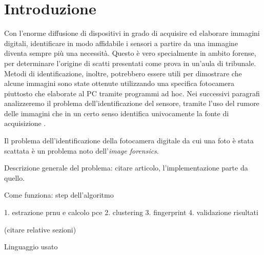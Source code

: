 \section{Introduzione}

Con l’enorme diffusione di dispositivi in grado di acquisire ed elaborare
immagini digitali, identificare in modo affidabile i sensori a partire da una
immagine diventa sempre più una necessità. Questo è vero specialmente in
ambito forense, per determinare l'origine di scatti presentati come prova in
un’aula di tribunale. Metodi di identificazione, inoltre, potrebbero essere utili
per dimostrare che alcune immagini sono state ottenute utilizzando una
specifica fotocamera piuttosto che elaborate al PC tramite programmi ad hoc.
Nei successivi paragrafi analizzeremo il problema dell’identificazione del
sensore, tramite l’uso del rumore delle immagini che in un certo senso
identifica univocamente la fonte di acquisizione . 


Il problema dell'identificazione della fotocamera digitale da cui una foto è stata scattata è un problema noto dell'\emph{image forensics}. 

Descrizione generale del problema: citare articolo, l'implementazione parte da quello.

Come funziona: step dell'algoritmo

1. estrazione prnu e calcolo pce
2. clustering 
3. fingerprint
4. validazione risultati

(citare relative sezioni)

Linguaggio usato